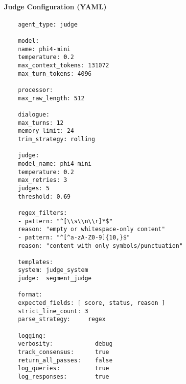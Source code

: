 \paragraph{Judge Configuration (YAML)}
\begin{verbatim}
	agent_type: judge
	
	model:
	name: phi4-mini
	temperature: 0.2
	max_context_tokens: 131072
	max_turn_tokens: 4096
	
	processor:
	max_raw_length: 512
	
	dialogue:
	max_turns: 12
	memory_limit: 24
	trim_strategy: rolling
	
	judge:
	model_name: phi4-mini
	temperature: 0.2
	max_retries: 3
	judges: 5
	threshold: 0.69
	
	regex_filters:
	- pattern: "^[\\s\\n\\r]*$"
	reason: "empty or whitespace-only content"
	- pattern: "^[^a-zA-Z0-9]{10,}$"
	reason: "content with only symbols/punctuation"
	
	templates:
	system: judge_system
	judge:  segment_judge
	
	format:
	expected_fields: [ score, status, reason ]
	strict_line_count: 3
	parse_strategy:     regex
	
	logging:
	verbosity:            debug
	track_consensus:      true
	return_all_passes:    false
	log_queries:          true
	log_responses:        true
\end{verbatim}